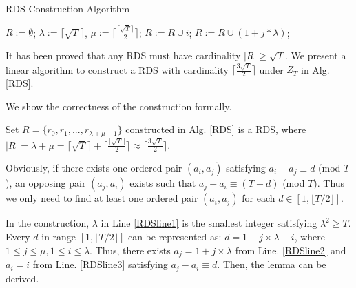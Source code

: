 \begin{algorithm}[!h]
    \caption{RDS Construction Algorithm}
    \label{RDS}
    \begin{algorithmic}[1]
    \STATE $R :=\emptyset$; $\lambda :=\lceil \sqrt{T}  \rceil$,
    $\mu :=\lceil \frac{\lceil \sqrt{T} \rceil}{2} \rceil$;\label{RDSline1}
        \STATE $R :=R \cup i$; \label{RDSline2}
    \ENDFOR
        \STATE $R :=R \cup (1 + j * \lambda )$; \label{RDSline3}
    \ENDFOR
    \end{algorithmic}
\end{algorithm}

It has been proved that any RDS must have cardinality $|R| \geq \sqrt{T}$\cite{luk1997two}.
We present a linear algorithm to construct a RDS with 
cardinality $\lceil \frac{3\sqrt{T}}{2}  \rceil$ under $Z_T$ in Alg. \ref{RDS}.

We show the correctness of the construction formally.
\begin{lemma}
\label{RDS1}
Set $R = \{r_0, r_1, ..., r_{\lambda + \mu - 1}\}$ constructed in Alg. \ref{RDS} is a RDS,
where $|R| = \lambda + \mu = \lceil \sqrt{T}  \rceil + \lceil \frac{\lceil \sqrt{T} \rceil}{2} \rceil
\approx \lceil \frac{3\sqrt{T}}{2}  \rceil$.
\end{lemma}
\begin{IEEEproof}
Obviously, if there exists one ordered pair $(a_i,a_j)$ satisfying  $a_i - a_j \equiv d$ (mod $T$),
an opposing pair $(a_j,a_i)$ exists such that
$a_j - a_i \equiv (T-d)$ (mod $T$). Thus we only need to find
at least one ordered pair $(a_i,a_j)$ for each $d \in [1, \lfloor T/2 \rfloor]$.

In the construction, $\lambda$ in Line \ref{RDSline1} is the smallest integer satisfying
$\lambda^2 \geq T$. Every $d$ in range $[1, \lfloor T/2 \rfloor]$
can be represented as: $ d = 1 + j \times \lambda - i$, where $1 \leq j \leq \mu,
1 \leq i \leq \lambda$. Thus, there exists $a_j = 1 + j \times \lambda$
from Line. \ref{RDSline2} and $a_i = i$ from Line. \ref{RDSline3}
satisfying  $a_j - a_i \equiv d$. Then, the lemma can be derived.
\end{IEEEproof}

